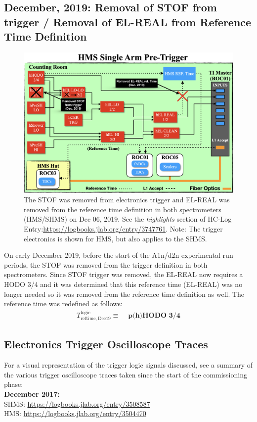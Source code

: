 \documentclass[11pt]{article}
\begin{document}
\subsection{December, 2019: Removal of STOF from trigger / Removal of EL-REAL from Reference Time Definition}\label{ssec:dec2019}
\begin{figure}[H]
  \centering
  \includegraphics[scale=0.38]{images/Dec2019_trigger_change.png}
  \caption{The STOF was removed from electronics trigger and EL-REAL was removed from the reference time definition in both spectrometers (HMS/SHMS) on Dec 06, 2019. See the \textit{highlights} section of
    HC-Log Entry:\url{https://logbooks.jlab.org/entry/3747761}. Note: The trigger
  electronics is shown for HMS, but also applies to the SHMS.}
  \label{fig:elreal_refTime_remove}
\end{figure}
\indent On early December 2019, before the start of the A1n/d2n experimental run periods, the STOF was removed from the trigger definition in both spectrometers.
Since STOF trigger was removed, the EL-REAL now requires a HODO 3/4 and it was determined that this reference time (EL-REAL) was no longer needed so it was removed
from the reference time definition as well. The reference time was redefined as follows:
\begin{align}
  T^{\mathrm{logic}}_{\mathrm{reftime,Dec19}} \equiv &\textbf{ p(h)HODO 3/4}
  \label{eq:refTime_def4}
\end{align}
\newpage
\subsection{Electronics Trigger Oscilloscope Traces}\label{ssec:traces}
For a visual representation of the trigger logic signals discussed, see a summary of the various trigger oscilloscope traces taken since the start of the commissioning phase:\\
\newline
\noindent \textbf{December 2017:}\\
SHMS: \url{https://logbooks.jlab.org/entry/3508587}\\
HMS: \url{https://logbooks.jlab.org/entry/3504470}\\
\end{document}
